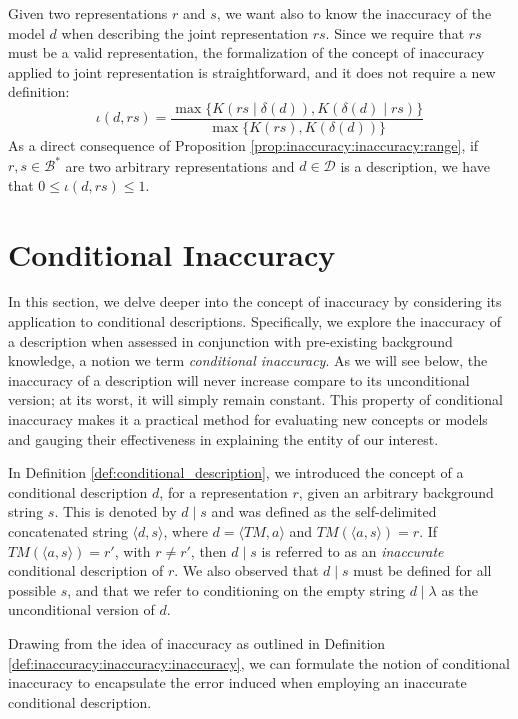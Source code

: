Given two representations $r$ and $s$, we want also to know the inaccuracy of the model $d$ when describing the joint representation $rs$. Since we require that $rs$ must be a valid representation, the formalization of the concept of inaccuracy applied to joint representation is straightforward, and it does not require a new definition:
\[
\iota(d, rs) = \frac{ \max\{ K \left(rs \mid \delta(d) \right), K \left( \delta(d) \mid rs \right) \} } { \max\{ K(rs), K \left(\delta(d) \right) \} }
\]
As a direct consequence of Proposition \ref{prop:inaccuracy:inaccuracy:range}, if $r, s \in \mathcal{B}^\ast$ are two arbitrary representations and $d \in \mathcal{D}$ is a description, we have that $0 \leq \iota(d, rs) \leq 1$.

%
%

\section{Conditional Inaccuracy}

In this section, we delve deeper into the concept of inaccuracy by considering its application to conditional descriptions. Specifically, we explore the inaccuracy of a description when assessed in conjunction with pre-existing background knowledge, a notion we term \emph{conditional inaccuracy}. As we will see below, the inaccuracy of a description will never increase compare to its unconditional version; at its worst, it will simply remain constant. This property of conditional inaccuracy makes it a practical method for evaluating new concepts or models and gauging their effectiveness in explaining the entity of our interest.

In Definition \ref{def:conditional_description}, we introduced the concept of a conditional description $d$, for a representation $r$, given an arbitrary background string $s$. This is denoted by $d \mid s$ and was defined as the self-delimited concatenated string $\langle d, s \rangle$, where $d = \langle TM, a \rangle$ and $TM \left(\langle a, s \rangle \right) = r$. If $TM \left(\langle a, s \rangle \right) = r'$, with $r \neq r'$, then $d \mid s$ is referred to as an \emph{inaccurate} conditional description of $r$. We also observed that $d \mid s$ must be defined for all possible $s$, and that we refer to conditioning on the empty string $d \mid \lambda$ as the unconditional version of $d$.

Drawing from the idea of inaccuracy as outlined in Definition \ref{def:inaccuracy:inaccuracy:inaccuracy}, we can formulate the notion of conditional inaccuracy to encapsulate the error induced when employing an inaccurate conditional description.

